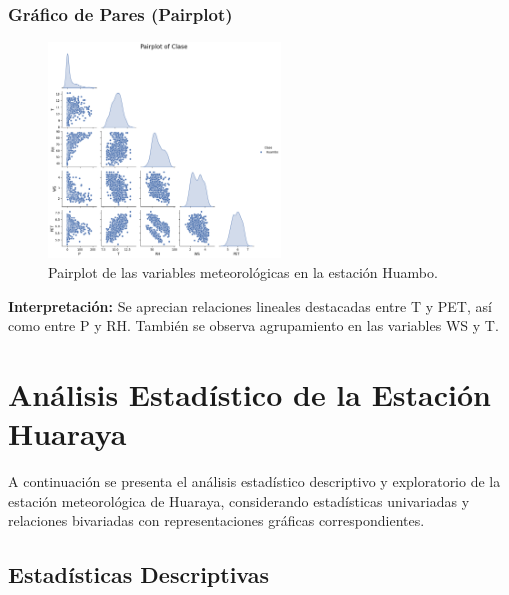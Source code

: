 \subsubsection*{Gráfico de Pares (Pairplot)}
\begin{figure}[H]
\centering
\includegraphics[width=0.55\textwidth]{resultados/por_estacion_meteorologica/Huambo/pairplot.png}
\caption{Pairplot de las variables meteorológicas en la estación Huambo.}
\label{fig:huambo_pairplot}
\end{figure}
\textbf{Interpretación:} Se aprecian relaciones lineales destacadas entre T y PET, así como entre P y RH. También se observa agrupamiento en las variables WS y T.



\section{Análisis Estadístico de la Estación Huaraya}

A continuación se presenta el análisis estadístico descriptivo y exploratorio de la estación meteorológica de Huaraya, considerando estadísticas univariadas y relaciones bivariadas con representaciones gráficas correspondientes.

\subsection{Estadísticas Descriptivas}


